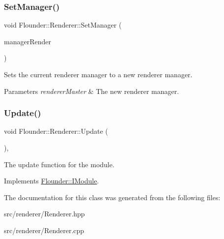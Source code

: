 \subsubsection{\texorpdfstring{Set\+Manager()}{SetManager()}}
{\footnotesize\ttfamily void Flounder\+::\+Renderer\+::\+Set\+Manager (\begin{DoxyParamCaption}\item[{\hyperlink{class_flounder_1_1_i_manager_render}{I\+Manager\+Render} $\ast$}]{manager\+Render }\end{DoxyParamCaption})\hspace{0.3cm}{\ttfamily [inline]}}



Sets the current renderer manager to a new renderer manager. 


\begin{DoxyParams}{Parameters}
{\em renderer\+Master} & The new renderer manager. \\
\hline
\end{DoxyParams}
\mbox{\label{class_flounder_1_1_renderer_a3d682d20ea5c7d16029675f6e17bf5d5}} 
\subsubsection{\texorpdfstring{Update()}{Update()}}
{\footnotesize\ttfamily void Flounder\+::\+Renderer\+::\+Update (\begin{DoxyParamCaption}{ }\end{DoxyParamCaption})\hspace{0.3cm}{\ttfamily [override]}, {\ttfamily [virtual]}}



The update function for the module. 



Implements \hyperlink{class_flounder_1_1_i_module_a1812bb03a6990e4698a10c043fa25fde}{Flounder\+::\+I\+Module}.



The documentation for this class was generated from the following files\+:\begin{DoxyCompactItemize}
\item 
src/renderer/Renderer.\+hpp\item 
src/renderer/Renderer.\+cpp\end{DoxyCompactItemize}
